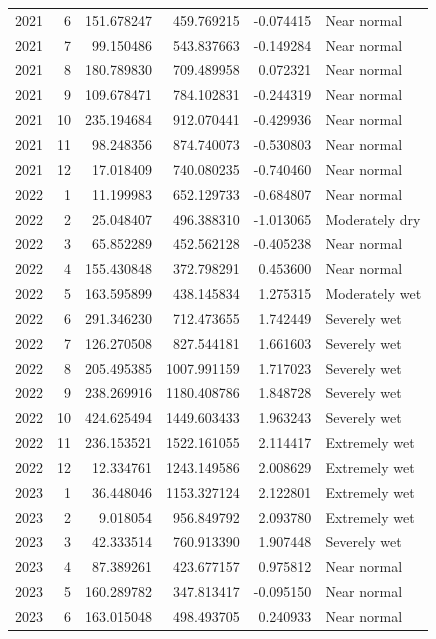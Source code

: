 \begin{tabular}{rrrrrl}
2021 & 6 & 151.678247 & 459.769215 & -0.074415 & Near normal \\
2021 & 7 & 99.150486 & 543.837663 & -0.149284 & Near normal \\
2021 & 8 & 180.789830 & 709.489958 & 0.072321 & Near normal \\
2021 & 9 & 109.678471 & 784.102831 & -0.244319 & Near normal \\
2021 & 10 & 235.194684 & 912.070441 & -0.429936 & Near normal \\
2021 & 11 & 98.248356 & 874.740073 & -0.530803 & Near normal \\
2021 & 12 & 17.018409 & 740.080235 & -0.740460 & Near normal \\
2022 & 1 & 11.199983 & 652.129733 & -0.684807 & Near normal \\
2022 & 2 & 25.048407 & 496.388310 & -1.013065 & Moderately dry \\
2022 & 3 & 65.852289 & 452.562128 & -0.405238 & Near normal \\
2022 & 4 & 155.430848 & 372.798291 & 0.453600 & Near normal \\
2022 & 5 & 163.595899 & 438.145834 & 1.275315 & Moderately wet \\
2022 & 6 & 291.346230 & 712.473655 & 1.742449 & Severely wet \\
2022 & 7 & 126.270508 & 827.544181 & 1.661603 & Severely wet \\
2022 & 8 & 205.495385 & 1007.991159 & 1.717023 & Severely wet \\
2022 & 9 & 238.269916 & 1180.408786 & 1.848728 & Severely wet \\
2022 & 10 & 424.625494 & 1449.603433 & 1.963243 & Severely wet \\
2022 & 11 & 236.153521 & 1522.161055 & 2.114417 & Extremely wet \\
2022 & 12 & 12.334761 & 1243.149586 & 2.008629 & Extremely wet \\
2023 & 1 & 36.448046 & 1153.327124 & 2.122801 & Extremely wet \\
2023 & 2 & 9.018054 & 956.849792 & 2.093780 & Extremely wet \\
2023 & 3 & 42.333514 & 760.913390 & 1.907448 & Severely wet \\
2023 & 4 & 87.389261 & 423.677157 & 0.975812 & Near normal \\
2023 & 5 & 160.289782 & 347.813417 & -0.095150 & Near normal \\
2023 & 6 & 163.015048 & 498.493705 & 0.240933 & Near normal \\

\end{tabular}
